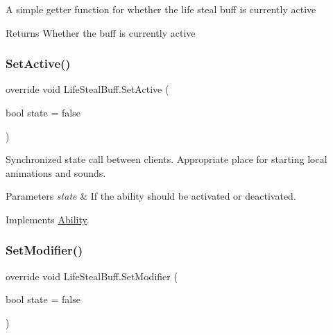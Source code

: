 A simple getter function for whether the life steal buff is currently active 

\begin{DoxyReturn}{Returns}
Whether the buff is currently active
\end{DoxyReturn}
\hypertarget{class_life_steal_buff_ab5f0d975e5b0e2c0125649c395f20ead}{}\label{class_life_steal_buff_ab5f0d975e5b0e2c0125649c395f20ead} 
\subsubsection{\texorpdfstring{Set\+Active()}{SetActive()}}
{\footnotesize\ttfamily override void Life\+Steal\+Buff.\+Set\+Active (\begin{DoxyParamCaption}\item[{bool}]{state = {\ttfamily false} }\end{DoxyParamCaption})\hspace{0.3cm}{\ttfamily [virtual]}}



Synchronized state call between clients. Appropriate place for starting local animations and sounds. 


\begin{DoxyParams}{Parameters}
{\em state} & If the ability should be activated or deactivated.\\
\hline
\end{DoxyParams}


Implements \hyperlink{class_ability_a10f7f3c2b63eeef6e352aee48d246384}{Ability}.

\hypertarget{class_life_steal_buff_a15b4e957b0023ccc3fe6349b721ed822}{}\label{class_life_steal_buff_a15b4e957b0023ccc3fe6349b721ed822} 
\subsubsection{\texorpdfstring{Set\+Modifier()}{SetModifier()}}
{\footnotesize\ttfamily override void Life\+Steal\+Buff.\+Set\+Modifier (\begin{DoxyParamCaption}\item[{bool}]{state = {\ttfamily false} }\end{DoxyParamCaption})\hspace{0.3cm}{\ttfamily [virtual]}}



